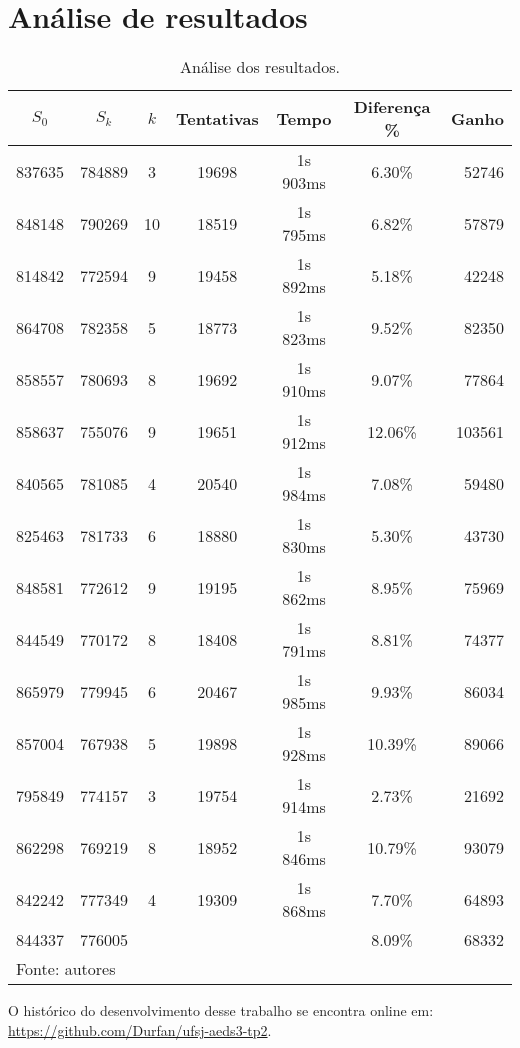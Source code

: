 \documentclass[12pt,a4paper]{article}
\renewcommand*{\arraystretch}{1.2}
\begin{document}
\section{Análise de resultados}

\begin{table}[H]
	\renewcommand{\arraystretch}{1}
	\centering
	\caption{Análise dos resultados.}
	\label{tab:resultados}
	\begin{tabular}{*{6}{c} r}
		\toprule 
		$S_{0}$ & $S_{k}$ & $k$ & Tentativas & Tempo & Diferença \% & Ganho \\ 
		\midrule
		837635 & 784889 &  3 & 19698 & 1s 903ms &  6.30\% &  52746 \\
		848148 & 790269 & 10 & 18519 & 1s 795ms &  6.82\% &  57879 \\
		814842 & 772594 &  9 & 19458 & 1s 892ms &  5.18\% &  42248 \\
		864708 & 782358 &  5 & 18773 & 1s 823ms &  9.52\% &  82350 \\
		858557 & 780693 &  8 & 19692 & 1s 910ms &  9.07\% &  77864 \\
		858637 & 755076 &  9 & 19651 & 1s 912ms & 12.06\% & 103561 \\
		840565 & 781085 &  4 & 20540 & 1s 984ms &  7.08\% &  59480 \\
		825463 & 781733 &  6 & 18880 & 1s 830ms &  5.30\% &  43730 \\
		848581 & 772612 &  9 & 19195 & 1s 862ms &  8.95\% &  75969 \\
		844549 & 770172 &  8 & 18408 & 1s 791ms &  8.81\% &  74377 \\
		865979 & 779945 &  6 & 20467 & 1s 985ms &  9.93\% &  86034 \\
		857004 & 767938 &  5 & 19898 & 1s 928ms & 10.39\% &  89066 \\
		795849 & 774157 &  3 & 19754 & 1s 914ms &  2.73\% &  21692 \\
		862298 & 769219 &  8 & 18952 & 1s 846ms & 10.79\% &  93079 \\
		842242 & 777349 &  4 & 19309 & 1s 868ms &  7.70\% &  64893 \\
		\midrule
		844337 & 776005 &    &       &          &  8.09\% &  68332 \\
		\bottomrule
		\multicolumn{6}{l}{\footnotesize Fonte: autores}
	\end{tabular}
\end{table}

\pagebreak

\begin{flushleft}
	\nocite{*}
	
	\vfill
	O histórico do desenvolvimento desse trabalho se encontra online em:\\ \url{https://github.com/Durfan/ufsj-aeds3-tp2}.
\end{flushleft}
\end{document}
